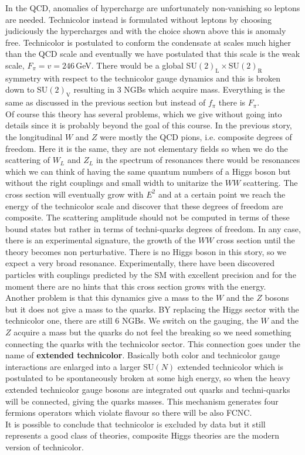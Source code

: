 \documentclass[../main.tex]{subfiles}
\begin{document}
In the QCD, anomalies of hypercharge are unfortunately non-vanishing so leptons are needed. Technicolor instead is formulated without leptons by choosing judiciously the hypercharges and with the choice shown above this is anomaly free. Technicolor is postulated to conform the condensate at scales much higher than the QCD scale and eventually we have postulated that this scale is the weak scale, $F_\pi=v=246$\,GeV. There would be a global SU$(2)_{\text{L}}\times$SU$(2)_{\text{R}}$ symmetry with respect to the technicolor gauge dynamics and this is broken down to SU$(2)_{\text{V}}$ resulting in 3 NGBs which acquire mass. Everything is the same as discussed in the previous section but instead of $f_\pi$ there is $F_\pi$.\\
Of course this theory has several problems, which we give without going into details since it is probably beyond the goal of this course. In the previous story, the longitudinal $W$ and $Z$ were mostly the QCD pions, i.e. composite degrees of freedom. Here it is the same, they are not elementary fields so when we do the scattering of $W_L$ and $Z_L$ in the spectrum of resonances there would be resonances which we can think of having the same quantum numbers of a Higgs boson but without the right couplings and small width to unitarize the $WW$ scattering. The cross section will eventually grow with $E^2$ and at a certain point we reach the energy of the technicolor scale and discover that these degrees of freedom are composite. The scattering amplitude should not be computed in terms of these bound states but rather in terms of techni-quarks degrees of freedom. In any case, there is an experimental signature, the growth of the $WW$ cross section until the theory becomes non perturbative. There is no Higgs boson in this story, so we expect a very broad resonance. Experimentally, there have been discovered particles with couplings predicted by the SM with excellent precision and for the moment there are no hints that this cross section grows with the energy.\\
Another problem is that this dynamics give a mass to the $W$ and the $Z$ bosons but it does not give a mass to the quarks. BY replacing the Higgs sector with the technicolor one, there are still 6 NGBs. We switch on the gauging, the $W$ and the $Z$ acquire a mass but the quarks do not feel the breaking so we need something connecting the quarks with the technicolor sector. This connection goes under the name of \textbf{extended technicolor}. Basically both color and technicolor gauge interactions are enlarged into a larger SU$(N)$ extended technicolor which is postulated to be spontaneously broken at some high energy, so when the heavy extended technicolor gauge bosons are integrated out quarks and techni-quarks will be connected, giving the quarks masses. This mechanism generates four fermions operators which violate flavour so there will be also FCNC.\\
It is possible to conclude that technicolor is excluded by data but it still represents a good class of theories, composite Higgs theories are the modern version of technicolor. 
\end{document}
